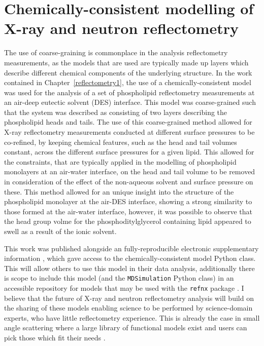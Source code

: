 \section{Chemically-consistent modelling of X-ray and neutron reflectometry}
The use of coarse-graining is commonplace in the analysis reflectometry measurements, as the models that are used are typically made up layers which describe different chemical components of the underlying structure.
In the work contained in Chapter~\ref{reflectometry1}, the use of a chemically-consistent model was used for the analysis of a set of phospholipid reflectometry measurements at an air-deep eutectic solvent (DES) interface.
This model was coarse-grained such that the system was described as consisting of two layers describing the phospholipid heads and tails.
The use of this coarse-grained method allowed for X-ray reflectometry measurements conducted at different surface pressures to be co-refined, by keeping chemical features, such as the head and tail volumes constant, across the different surface pressures for a given lipid.
This allowed for the constraints, that are typically applied in the modelling of phospholipid monolayers at an air-water interface, on the head and tail volume to be removed in consideration of the effect of the non-aqueous solvent and surface pressure on these.
This method allowed for an unique insight into the structure of the phospholipid monolayer at the air-DES interface, showing a strong similarity to those formed at the air-water interface, however, it was possible to observe that the head group volme for the phosphoditylglycerol containing lipid appeared to swell as a result of the ionic solvent.

This work was published alongside an fully-reproducible electronic supplementary information \cite{mccluskey_bayesian_2019,mccluskey_lipids_at_airdes_2019}, which gave access to the chemically-consistent model Python class.
This will allow others to use this model in their data analysis, additionally there is scope to include this model (and the \texttt{MDSimulation} Python class) in an accessible repository for models that may be used with the \texttt{refnx} package \cite{nelson_refnx_2019,nelson_refnx_2019-1,nelson_refnx-models_nodate}.
I believe that the future of X-ray and neutron reflectometry analysis will build on the sharing of these models enabling science to be performed by science-domain experts, who have little reflectometry experience.
This is already the case in small angle scattering where a large library of functional models exist and users can pick those which fit their needs \cite{noauthor_sasfit_nodate,noauthor_sasview_nodate}.

